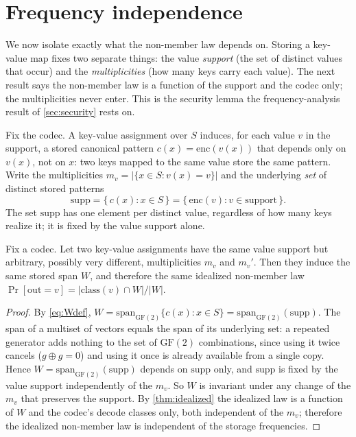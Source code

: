 \documentclass[acmsmall,review]{acmart}
\newcommand{\enc}{\mathrm{enc}}
\newcommand{\GF}{\mathrm{GF}(2)}
\newcommand{\spn}{\mathrm{span}}
\newcommand{\class}{\mathrm{class}}
\newcommand{\W}{W}                          %
\newcommand{\supp}{\mathrm{supp}}           %
\newcommand{\cx}{c(x)}                      %
\newcommand{\inter}{\cap}
\begin{document}
\section{Frequency independence}
\label{sec:t3}

We now isolate exactly what the non-member law depends on. Storing a key-value map
fixes two separate things: the value \emph{support} (the set of distinct values that
occur) and the \emph{multiplicities} (how many keys carry each value). The next result
says the non-member law is a function of the support and the codec only; the
multiplicities never enter. This is the security lemma the frequency-analysis result
of \cref{sec:security} rests on.

Fix the codec. A key-value assignment over $S$ induces, for each value $v$ in the
support, a stored canonical pattern $\cx = \enc(v(x))$ that depends only on $v(x)$,
not on $x$: two keys mapped to the same value store the same pattern. Write the
multiplicities $m_v = |\{x \in S : v(x) = v\}|$ and the underlying \emph{set} of
distinct stored patterns
\[
  \supp = \{\, \cx : x \in S \,\} = \{\, \enc(v) : v \in \text{support} \,\}.
\]
The set $\supp$ has one element per distinct value, regardless of how many keys
realize it; it is fixed by the value support alone.

\begin{theorem}
\label{thm:freqindep}
Fix a codec. Let two key-value assignments have the same value support but arbitrary,
possibly very different, multiplicities $m_v$ and $m_v'$. Then they induce the same
stored span $\W$, and therefore the same idealized non-member law
$\Pr[\mathrm{out} = v] = |\class(v) \inter \W| / |\W|$.
\end{theorem}

\begin{proof}
By \eqref{eq:Wdef}, $\W = \spn_{\GF}\{\cx : x \in S\} = \spn_{\GF}(\supp)$. The span of
a multiset of vectors equals the span of its underlying set: a repeated generator adds
nothing to the set of $\GF$ combinations, since using it twice cancels
($g \oplus g = 0$) and using it once is already available from a single copy. Hence
$\W = \spn_{\GF}(\supp)$ depends on $\supp$ only, and $\supp$ is fixed by the value
support independently of the $m_v$. So $\W$ is invariant under any change of the $m_v$
that preserves the support. By \cref{thm:idealized} the idealized law is a function of
$\W$ and the codec's decode classes only, both independent of the $m_v$; therefore the
idealized non-member law is independent of the storage frequencies.
\end{proof}
\end{document}
